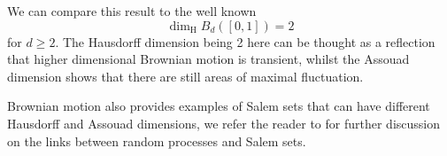 We can compare this result to the well known \[\dim_{\mathrm{H}} B_d([0,1])=2\] for $d\geq 2$. The Hausdorff dimension being 2 here can be thought as a reflection that higher dimensional Brownian motion is transient, whilst the Assouad dimension shows that there are still areas of maximal fluctuation. 

Brownian motion also provides examples of Salem sets that can have different Hausdorff and Assouad dimensions, we refer the reader to \cite{Ka}  for further discussion on the links between random processes and Salem sets.












